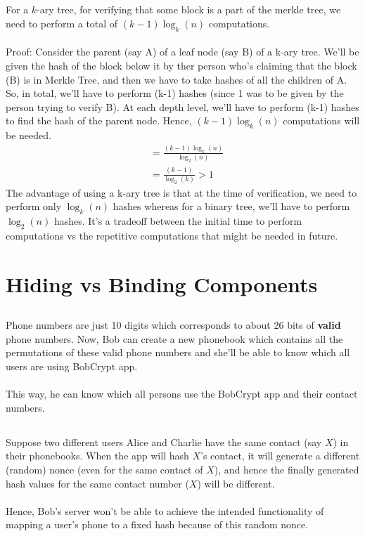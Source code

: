 \documentclass[12pt, a4paper]{article}
\newcommand{\bo}{\textbf}
\begin{document}
\subsection{}
For a $k$-ary tree, for verifying that some block is a part of the merkle tree, we need to perform a total of 
$(k-1) \log_k{(n)} $ computations. \\ \\
Proof: Consider the parent (say A) of a leaf node (say B) of a k-ary tree. We'll be given the hash of the block below it by ther person who's claiming that the block (B) is in Merkle Tree, and then we have to take hashes of all the children of A.  
\\ 
So, in total, we'll have to perform (k-1) hashes (since 1 was to be given by the person trying to verify B). At each depth level, we'll have to perform (k-1) hashes to find the hash of the parent node. Hence, $(k-1) \log_k{(n)} $ computations will be needed.
\begin{align*}
	&= \frac{(k-1) \log_k{(n)}} {\log_2{(n)}} \\
	&= \frac{(k-1)}{\log_2{(k)}} > 1 
\end{align*}
The advantage of using a k-ary tree is that at the time of verification, we need to perform only $\log_k{(n)}$ hashes whereas for a binary tree, we'll have to perform $\log_2{(n)}$ hashes. It's a tradeoff between the initial time to perform computations vs the repetitive computations that might be needed in future.
\section{Hiding vs Binding Components}
\subsection{}
Phone numbers are just 10 digits which corresponds to about 26 bits of \bo{valid} phone numbers. Now, Bob can create a new phonebook which contains all the permutations of these valid phone numbers and she'll be able to know which all users are using BobCrypt app. \\ \\
This way, he can know which all persons use the BobCrypt app and their contact numbers.
\subsection{}
Suppose two different users Alice and Charlie have the same contact (say $X$) in their phonebooks. 
When the app will hash $X$'s contact, it will generate a different (random) nonce (even for the same contact of $X$), and hence the finally generated hash values for the same contact number ($X$) will be different. 
\\ \\
Hence, Bob's server won't be able to achieve the intended functionality of mapping a user's phone to a fixed hash because of this random nonce.
\end{document}

